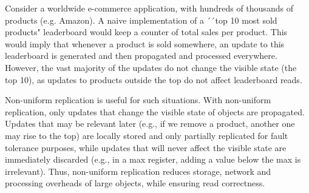 Consider a worldwide e-commerce application, with hundreds of thousands of  products (e.g. Amazon).
A naive implementation of a ´´top 10 most sold products" leaderboard would keep a counter of total sales per product.
This would imply that whenever a product is sold somewhere, an update to this leaderboard is generated and then propagated and processed everywhere.
However, the vast majority of the updates do not change the visible state (the top 10), as updates to products outside the top do not affect leaderboard reads.

Non-uniform replication \cite{nonUniform} is useful for such situations.
With non-uniform replication, only updates that change the visible state of objects are propagated.
Updates that may be relevant later (e.g., if we remove a product, another one may rise to the top) are locally stored and only partially replicated for fault tolerance purposes, while updates that will never affect the visible state are immediately discarded (e.g., in a max register, adding a value below the max is irrelevant).
Thus, non-uniform replication reduces storage, network and processing overheads of large objects, while ensuring read correctness.

